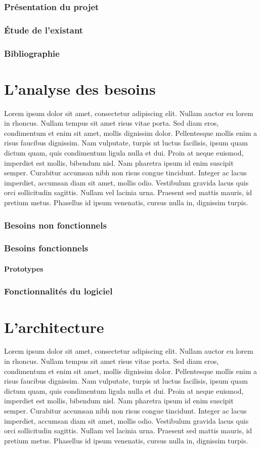 \documentclass[12pt]{article}
\begin{document}
	\section{Présentation du projet}
	\section{Étude de l’existant}
	\section{Bibliographie}

\part{L'analyse des besoins}
Lorem ipsum dolor sit amet, consectetur adipiscing elit. Nullam auctor eu lorem in rhoncus. Nullam tempus sit amet risus vitae porta. Sed diam eros, condimentum et enim sit amet, mollis dignissim dolor. Pellentesque mollis enim a risus faucibus dignissim. Nam vulputate, turpis ut luctus facilisis, ipsum quam dictum quam, quis condimentum ligula nulla et dui. Proin at neque euismod, imperdiet est mollis, bibendum nisl. Nam pharetra ipsum id enim suscipit semper. Curabitur accumsan nibh non risus congue tincidunt. Integer ac lacus imperdiet, accumsan diam sit amet, mollis odio. Vestibulum gravida lacus quis orci sollicitudin sagittis. Nullam vel lacinia urna. Praesent sed mattis mauris, id pretium metus. Phasellus id ipsum venenatis, cursus nulla in, dignissim turpis.
	\section{Besoins non fonctionnels}
	\section{Besoins fonctionnels}
		\subsection{Prototypes}
	\section{Fonctionnalités du logiciel}

\part{L'architecture}
Lorem ipsum dolor sit amet, consectetur adipiscing elit. Nullam auctor eu lorem in rhoncus. Nullam tempus sit amet risus vitae porta. Sed diam eros, condimentum et enim sit amet, mollis dignissim dolor. Pellentesque mollis enim a risus faucibus dignissim. Nam vulputate, turpis ut luctus facilisis, ipsum quam dictum quam, quis condimentum ligula nulla et dui. Proin at neque euismod, imperdiet est mollis, bibendum nisl. Nam pharetra ipsum id enim suscipit semper. Curabitur accumsan nibh non risus congue tincidunt. Integer ac lacus imperdiet, accumsan diam sit amet, mollis odio. Vestibulum gravida lacus quis orci sollicitudin sagittis. Nullam vel lacinia urna. Praesent sed mattis mauris, id pretium metus. Phasellus id ipsum venenatis, cursus nulla in, dignissim turpis.
\end{document}
